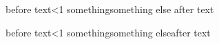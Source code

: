 before text\ifodd\x<1 something\else something else \fi after text

before text\ifodd\x<1 something\else something else\fi after text
